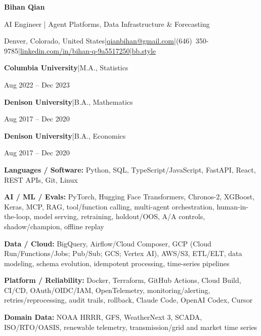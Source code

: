\documentclass{article}
\newcommand{\sep}{\enspace|\enspace}
\newcommand{\name}[1]{{\color{navy}\bfseries#1}}
\newcommand{\when}[1]{\hfill{\color{muted}#1\par}}
\newcommand{\heading}[1]{\addvspace{4bp}\name{#1}\par
  \vspace{1.5bp}{\color{rule}\hrule}\vspace{3bp}}
\begin{document}
\fontsize{10bp}{12bp}\selectfont\color{ink}

{\centering
\name{\fontsize{20bp}{24bp}\selectfont Bihan Qian}\par
{\fontsize{10.5bp}{14bp}\selectfont\color{muted}AI Engineer | Agent Platforms, Data Infrastructure \& Forecasting\par}
\vspace{2bp}
{\fontsize{9.5bp}{12bp}\selectfont Denver, Colorado, United States\sep\href{mailto:qianbihan@gmail.com}{qianbihan@gmail.com}\sep(646)~350-9785\sep\href{https://www.linkedin.com/in/bihan-q-9a5517250}{linkedin.com/in/bihan-q-9a5517250}\sep\href{https://bb.style/}{bb.style}\par}}

\heading{EDUCATION}
\name{Columbia University}\sep M.A., Statistics\when{Aug 2022 -- Dec 2023}
\vspace{1bp}
\name{Denison University}\sep B.A., Mathematics\when{Aug 2017 -- Dec 2020}
\vspace{1bp}
\name{Denison University}\sep B.A., Economics\when{Aug 2017 -- Dec 2020}

\heading{SKILLS}
\name{Languages / Software:} Python, SQL, TypeScript/JavaScript, FastAPI, React, REST APIs, Git, Linux\par
\name{AI / ML / Evals:} PyTorch, Hugging Face Transformers, Chronos-2, XGBoost, Keras, MCP, RAG, tool/function calling, multi-agent orchestration, human-in-the-loop, model serving, retraining, holdout/OOS, A/A controls, shadow/champion, offline replay\par
\name{Data / Cloud:} BigQuery, Airflow/Cloud Composer, GCP (Cloud Run/Functions/Jobs; Pub/Sub; GCS; Vertex AI), AWS/S3, ETL/ELT, data modeling, schema evolution, idempotent processing, time-series pipelines\par
\name{Platform / Reliability:} Docker, Terraform, GitHub Actions, Cloud Build, CI/CD, OAuth/OIDC/IAM, OpenTelemetry, monitoring/alerting, retries/reprocessing, audit trails, rollback, Claude Code, OpenAI Codex, Cursor\par
\name{Domain Data:} NOAA HRRR, GFS, WeatherNext 3, SCADA, ISO/RTO/OASIS, renewable telemetry, transmission/grid and market time series\par
\end{document}
